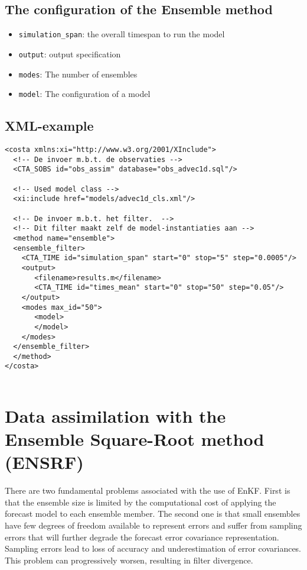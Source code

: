 \subsection{The configuration of the Ensemble method}
\begin{itemize}
\item {\tt simulation\_span}: the overall timespan to run the model
\item {\tt output}: output specification
\item {\tt modes}: The number of ensembles
\item {\tt model}: The configuration of a model
\end{itemize}

\subsection{XML-example}
\begin{verbatim}
<costa xmlns:xi="http://www.w3.org/2001/XInclude">
  <!-- De invoer m.b.t. de observaties -->
  <CTA_SOBS id="obs_assim" database="obs_advec1d.sql"/>

  <!-- Used model class -->
  <xi:include href="models/advec1d_cls.xml"/>

  <!-- De invoer m.b.t. het filter.  -->
  <!-- Dit filter maakt zelf de model-instantiaties aan -->
  <method name="ensemble"> 
  <ensemble_filter>
    <CTA_TIME id="simulation_span" start="0" stop="5" step="0.0005"/>
    <output>
       <filename>results.m</filename>
       <CTA_TIME id="times_mean" start="0" stop="50" step="0.05"/>
    </output>
    <modes max_id="50">
       <model>
       </model>
    </modes>
  </ensemble_filter>
  </method> 
</costa>


\end{verbatim}


\section{Data assimilation  with the Ensemble Square-Root method (ENSRF)}

There are two fundamental problems associated with the use of EnKF. First is
that the ensemble size is limited by the computational cost of applying the
forecast model to each ensemble member. The second one is that small ensembles
have few degrees of freedom available to represent errors and suffer from
sampling errors that will further degrade the forecast error covariance
representation. Sampling errors lead to loss of accuracy and underestimation of
error covariances. This problem can progressively worsen, resulting in filter
divergence.

